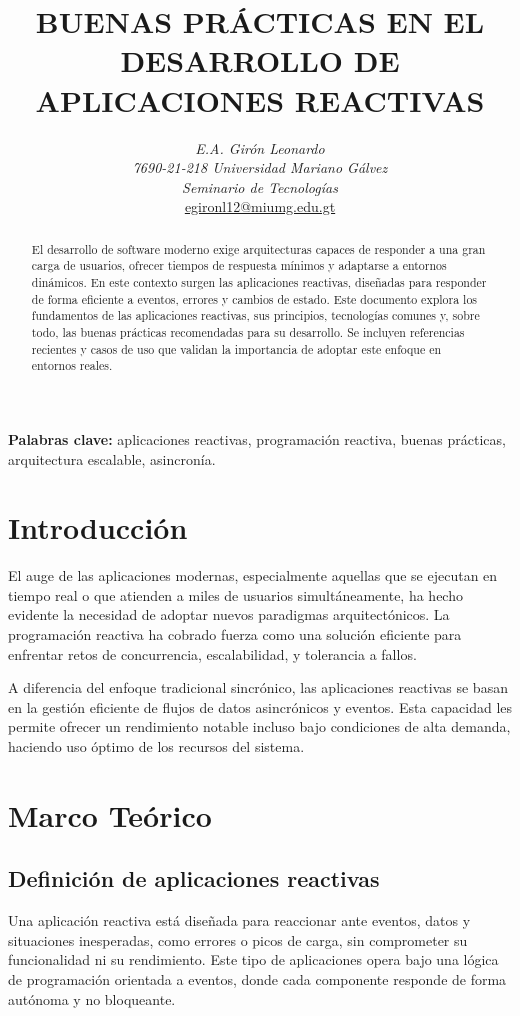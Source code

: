 \documentclass{article}
\title{\textbf{BUENAS PRÁCTICAS EN EL DESARROLLO DE APLICACIONES REACTIVAS}}
\author{%
    \begin{tabular}{c}
        \textit{E.A. Girón Leonardo} \\
        \textit{7690-21-218 Universidad Mariano Gálvez} \\
        \textit{Seminario de Tecnologías} \\
        \href{mailto:egironl12@miumg.edu.gt}{\uline{egironl12@miumg.edu.gt}}
    \end{tabular}%
}
\date{}
\begin{document}
\maketitle

\begin{abstract}
El desarrollo de software moderno exige arquitecturas capaces de responder a una gran carga de usuarios, ofrecer tiempos de respuesta mínimos y adaptarse a entornos dinámicos. En este contexto surgen las aplicaciones reactivas, diseñadas para responder de forma eficiente a eventos, errores y cambios de estado. Este documento explora los fundamentos de las aplicaciones reactivas, sus principios, tecnologías comunes y, sobre todo, las buenas prácticas recomendadas para su desarrollo. Se incluyen referencias recientes y casos de uso que validan la importancia de adoptar este enfoque en entornos reales.
\end{abstract}

\textbf{Palabras clave:} aplicaciones reactivas, programación reactiva, buenas prácticas, arquitectura escalable, asincronía.

\section{Introducción}

El auge de las aplicaciones modernas, especialmente aquellas que se ejecutan en tiempo real o que atienden a miles de usuarios simultáneamente, ha hecho evidente la necesidad de adoptar nuevos paradigmas arquitectónicos. La programación reactiva ha cobrado fuerza como una solución eficiente para enfrentar retos de concurrencia, escalabilidad, y tolerancia a fallos.

A diferencia del enfoque tradicional sincrónico, las aplicaciones reactivas se basan en la gestión eficiente de flujos de datos asincrónicos y eventos. Esta capacidad les permite ofrecer un rendimiento notable incluso bajo condiciones de alta demanda, haciendo uso óptimo de los recursos del sistema.

\section{Marco Teórico}

\subsection{Definición de aplicaciones reactivas}

Una aplicación reactiva está diseñada para reaccionar ante eventos, datos y situaciones inesperadas, como errores o picos de carga, sin comprometer su funcionalidad ni su rendimiento. Este tipo de aplicaciones opera bajo una lógica de programación orientada a eventos, donde cada componente responde de forma autónoma y no bloqueante.
\end{document}
